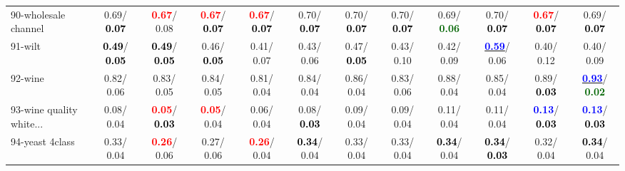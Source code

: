 \begin{table}[h]
\begin{center}
{\begin{tabular}{lc|c|c|c|c|c|c|c|c|c|c}
90-wholesale channel &   0.69/\textcolor{black}{\textbf{  0.07}} & \textcolor{red}{\textbf{  0.67}}/  0.08 & \textcolor{red}{\textbf{  0.67}}/\textcolor{black}{\textbf{  0.07}} & \textcolor{red}{\textbf{  0.67}}/\textcolor{black}{\textbf{  0.07}} &   0.70/\textcolor{black}{\textbf{  0.07}} &   0.70/\textcolor{black}{\textbf{  0.07}} &   0.70/\textcolor{black}{\textbf{  0.07}} &   0.69/\textcolor{darkgreen}{\textbf{  0.06}} &   0.70/\textcolor{black}{\textbf{  0.07}} & \textcolor{red}{\textbf{  0.67}}/\textcolor{black}{\textbf{  0.07}} &   0.69/\textcolor{black}{\textbf{  0.07}} \\
91-wilt & \textcolor{black}{\textbf{  0.49}}/\textcolor{black}{\textbf{  0.05}} & \textcolor{black}{\textbf{  0.49}}/\textcolor{black}{\textbf{  0.05}} &   0.46/\textcolor{black}{\textbf{  0.05}} &   0.41/  0.07 &   0.43/  0.06 &   0.47/\textcolor{black}{\textbf{  0.05}} &   0.43/  0.10 &   0.42/  0.09 & \underline{\textcolor{blue}{\textbf{  0.59}}}/  0.06 &   0.40/  0.12 &   0.40/  0.09 \\
92-wine &   0.82/  0.06 &   0.83/  0.05 &   0.84/  0.05 &   0.81/  0.04 &   0.84/  0.04 &   0.86/  0.04 &   0.83/  0.06 &   0.88/  0.04 &   0.85/  0.04 &   0.89/\textcolor{black}{\textbf{  0.03}} & \underline{\textcolor{blue}{\textbf{  0.93}}}/\textcolor{darkgreen}{\textbf{  0.02}} \\ \hline
93-wine quality white... &   0.08/  0.04 & \textcolor{red}{\textbf{  0.05}}/\textcolor{black}{\textbf{  0.03}} & \textcolor{red}{\textbf{  0.05}}/  0.04 &   0.06/  0.04 &   0.08/\textcolor{black}{\textbf{  0.03}} &   0.09/  0.04 &   0.09/  0.04 &   0.11/  0.04 &   0.11/  0.04 & \textcolor{blue}{\textbf{  0.13}}/\textcolor{black}{\textbf{  0.03}} & \textcolor{blue}{\textbf{  0.13}}/\textcolor{black}{\textbf{  0.03}} \\
94-yeast 4class &   0.33/  0.04 & \textcolor{red}{\textbf{  0.26}}/  0.06 &   0.27/  0.06 & \textcolor{red}{\textbf{  0.26}}/  0.04 & \textcolor{black}{\textbf{  0.34}}/  0.04 &   0.33/  0.04 &   0.33/  0.04 & \textcolor{black}{\textbf{  0.34}}/  0.04 & \textcolor{black}{\textbf{  0.34}}/\textcolor{black}{\textbf{  0.03}} &   0.32/  0.04 & \textcolor{black}{\textbf{  0.34}}/  0.04 \\\end{tabular}
}\label{strats2bSVM}
\end{center}
\end{table}